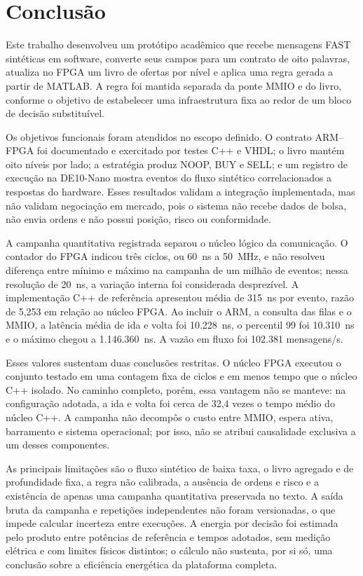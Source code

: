 
\chapter{Conclusão}\label{cap:conclusoeseperspectivas}

Este trabalho desenvolveu um protótipo acadêmico que recebe mensagens FAST sintéticas em software, converte seus campos para um contrato de oito palavras, atualiza no FPGA um livro de ofertas por nível e aplica uma regra gerada a partir de MATLAB. A regra foi mantida separada da ponte MMIO e do livro, conforme o objetivo de estabelecer uma infraestrutura fixa ao redor de um bloco de decisão substituível.

Os objetivos funcionais foram atendidos no escopo definido. O contrato ARM--FPGA foi documentado e exercitado por testes C++ e VHDL; o livro mantém oito níveis por lado; a estratégia produz NOOP, BUY e SELL; e um registro de execução na DE10-Nano mostra eventos do fluxo sintético correlacionados a respostas do hardware. Esses resultados validam a integração implementada, mas não validam negociação em mercado, pois o sistema não recebe dados de bolsa, não envia ordens e não possui posição, risco ou conformidade.

A campanha quantitativa registrada separou o núcleo lógico da comunicação. O contador do FPGA indicou três ciclos, ou 60~ns a 50~MHz, e não resolveu diferença entre mínimo e máximo na campanha de um milhão de eventos; nessa resolução de 20~ns, a variação interna foi considerada desprezível. A implementação C++ de referência apresentou média de 315~ns por evento, razão de 5,253 em relação ao núcleo FPGA. Ao incluir o ARM, a consulta das filas e o MMIO, a latência média de ida e volta foi 10.228~ns, o percentil 99 foi 10.310~ns e o máximo chegou a 1.146.360~ns. A vazão em fluxo foi 102.381 mensagens/s.

Esses valores sustentam duas conclusões restritas. O núcleo FPGA executou o conjunto testado em uma contagem fixa de ciclos e em menos tempo que o núcleo C++ isolado. No caminho completo, porém, essa vantagem não se manteve: na configuração adotada, a ida e volta foi cerca de 32,4 vezes o tempo médio do núcleo C++. A campanha não decompôs o custo entre MMIO, espera ativa, barramento e sistema operacional; por isso, não se atribui causalidade exclusiva a um desses componentes.

As principais limitações são o fluxo sintético de baixa taxa, o livro agregado e de profundidade fixa, a regra não calibrada, a ausência de ordens e risco e a existência de apenas uma campanha quantitativa preservada no texto. A saída bruta da campanha e repetições independentes não foram versionadas, o que impede calcular incerteza entre execuções. A energia por decisão foi estimada pelo produto entre potências de referência e tempos adotados, sem medição elétrica e com limites físicos distintos; o cálculo não sustenta, por si só, uma conclusão sobre a eficiência energética da plataforma completa.

